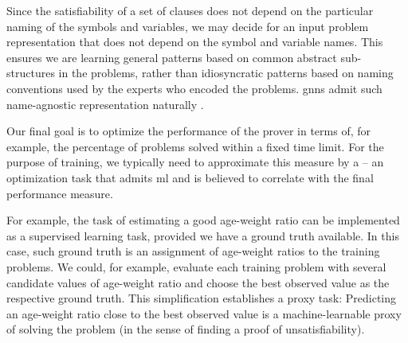 Since the satisfiability of a set of clauses does not depend on the particular naming of the symbols and variables,
we may decide for an input problem representation that does not depend on the symbol and variable names.
This ensures we are learning general patterns based on common abstract sub-structures in the problems,
rather than idiosyncratic patterns based on naming conventions used by the experts who encoded the problems.
\Glspl{gnn} admit such name-agnostic representation naturally \cite{DBLP:conf/cade/JakubuvCOP0U20}.

Our final goal is to optimize the performance of the prover in terms of, for example, the percentage of problems solved within a fixed time limit.
For the purpose of training,
we typically need to approximate this measure by a  -- an optimization task that admits \gls{ml} and is believed to correlate with the final performance measure.

For example, the task of estimating a good age-weight ratio can be implemented as a supervised learning task, provided we have a ground truth available.
In this case, such ground truth is an assignment of age-weight ratios to the training problems.
We could, for example, evaluate each training problem with several candidate values of age-weight ratio and choose the best observed value as the respective ground truth.
This simplification establishes a proxy task:
Predicting an age-weight ratio close to the best observed value is a machine-learnable proxy of solving the problem (in the sense of finding a proof of unsatisfiability).


